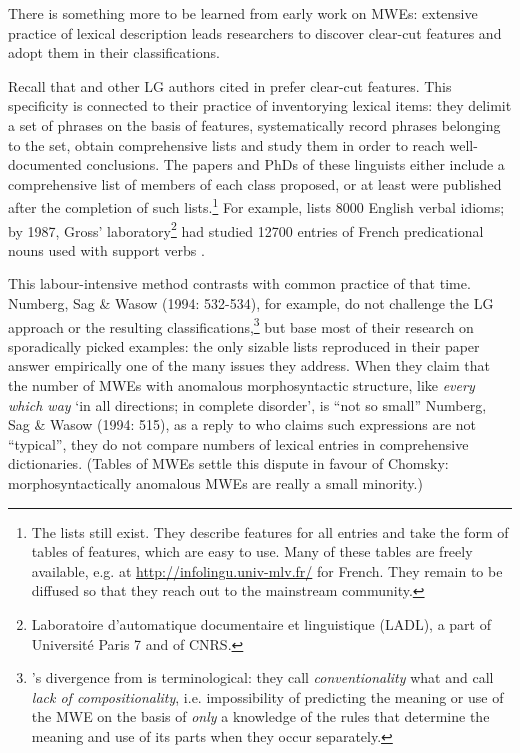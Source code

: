\documentclass[output=paper]{langsci/langscibook}
\begin{document}
There is something more to be learned from early work on MWEs: extensive practice of lexical description leads researchers to discover clear-cut features and adopt them in their classifications.

Recall that \citet{Labelle1974} and other LG authors cited in  prefer clear-cut features. This specificity is connected to their practice of inventorying lexical items: they delimit a set of phrases on the basis of features, systematically record phrases belonging to the set, obtain comprehensive lists and study them in order to reach well-documented conclusions. The papers and PhDs of these linguists either include a comprehensive list of members of each class proposed, or at least were published after the completion of such lists.\footnote{ The lists still exist. They describe features for all entries and take the form of tables of features, which are easy to use. Many of these tables are freely available, e.g. at \url{http://infolingu.univ-mlv.fr/} for French. They remain to be diffused so that they reach out to the mainstream community.} For example, \citet{Freckleton1985} lists 8000 English verbal idioms; by 1987, Gross’ laboratory\footnote{ Laboratoire d’automatique documentaire et linguistique (LADL), a part of Université Paris 7 and of CNRS.} had studied 12700 entries of French predicational nouns used with support verbs \citep[144]{Tolone2011}. 

This labour-intensive method contrasts with common practice of that time. Numberg, Sag \& Wasow (1994: 532-534), for example, do not challenge the LG approach or the resulting classifications,\footnote{\citet[498]{Nunberg1994}’s  divergence from \citet{Machonis1985} is terminological: they call \textit{conventionality} what \citet[306]{Machonis1985} and \cite[128-129]{Danlos1988}  call \textit{lack of compositionality}, i.e. impossibility of predicting the meaning or use of the MWE on the basis of \textit{only} a knowledge of the rules that determine the meaning and use of its parts when they occur separately.} but base most of their research on sporadically picked examples: the only sizable lists reproduced in their paper answer empirically one of the many issues they address. When they claim that the number of MWEs with anomalous morphosyntactic structure, like \textit{every which way} ‘in all directions; in complete disorder’, is “not so small” Numberg, Sag \& Wasow (1994: 515), as a reply to \citet[149]{Chomsky1980} who claims such expressions are not “typical”, they do not compare numbers of lexical entries in comprehensive dictionaries. (Tables of MWEs settle this dispute in favour of Chomsky: morphosyntactically anomalous MWEs are really a small minority.) %
\end{document}
